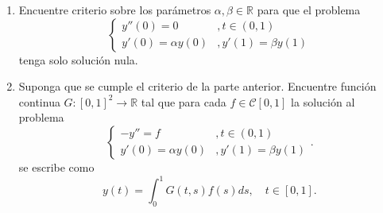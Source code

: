 \begin{problema}
\begin{enumerate}[leftmargin=1em,itemsep=.5em]
	\item
	Encuentre criterio sobre los parámetros \(\alpha, \beta \in \mathbb{R}\)
	para que el problema
	\[
		\begin{cases}
			y''(0) = 0 &, t\in (0,1)\\
			y'(0) = \alpha y(0) &, y'(1) = \beta y(1)
		\end{cases}
	\]
	tenga solo solución nula.

	\item
	Suponga que se cumple el criterio de la parte anterior. Encuentre función
	continua \(G\colon [0,1]^2 \to \mathbb{R}\) tal que para cada \(f\in
	\mathcal{C}[0,1]\) la solución al problema
	\[
		\begin{cases}
			-y'' = f &, t\in (0,1)\\
			y'(0) = \alpha y(0) &, y'(1) = \beta y(1)
		\end{cases}
	.\]
	se escribe como
	\[
		y(t) = \int_{0}^{1} G(t,s) f(s) ds, \quad t\in [0,1]
	.\]
\end{enumerate}
\end{problema}
